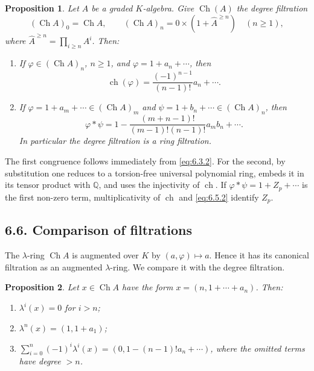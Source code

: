 \documentclass[13pt]{extarticle}
\newcommand{\QQ}{\mathbb Q}
\newcommand{\Ch}{\operatorname{Ch}}
\newcommand{\ch}{\operatorname{ch}}
\newtheorem*{proposition}{Proposition}
\begin{document}
\begin{proposition}\label{prop:6.5}
Let $A$ be a graded $K$-algebra. Give $\Ch(A)$ the degree filtration
\begin{equation}\label{eq:6.5.1}
(\Ch A)_0=\Ch A,
\qquad
(\Ch A)_n=0\times(1+\widehat A^{\geq n})\quad(n\geq 1),
\end{equation}
where $\widehat A^{\geq n}=\prod_{i\geq n}A^i$. Then:
\begin{enumerate}[label=(\roman*)]
\item If $\varphi\in(\Ch A)_n$, $n\geq 1$, and $\varphi=1+a_n+\cdots$, then
\begin{equation}\label{eq:6.5.2}
\ch(\varphi)=\frac{(-1)^{n-1}}{(n-1)!}a_n+\cdots.
\end{equation}
\item If $\varphi=1+a_m+\cdots\in(\Ch A)_m$ and $\psi=1+b_n+\cdots\in(\Ch A)_n$, then
\begin{equation}\label{eq:6.5.3}
\varphi*\psi=1-\frac{(m+n-1)!}{(m-1)!(n-1)!}a_mb_n+\cdots.
\end{equation}
In particular the degree filtration is a ring filtration.
\end{enumerate}
\end{proposition}

The first congruence follows immediately from \eqref{eq:6.3.2}. For the second, by substitution one reduces to a torsion-free universal polynomial ring, embeds it in its tensor product with $\QQ$, and uses the injectivity of $\ch$. If $\varphi*\psi=1+Z_p+\cdots$ is the first non-zero term, multiplicativity of $\ch$ and \eqref{eq:6.5.2} identify $Z_p$.

\subsection*{6.6. Comparison of filtrations}
The $\lambda$-ring $\Ch A$ is augmented over $K$ by $(a,\varphi)\mapsto a$. Hence it has its canonical filtration as an augmented $\lambda$-ring. We compare it with the degree filtration.

\begin{proposition}\label{prop:6.6.1}
Let $x\in\Ch A$ have the form $x=(n,1+\cdots+a_n)$. Then:
\begin{enumerate}[label=(\roman*)]
\item $\lambda^i(x)=0$ for $i>n$;
\item $\lambda^n(x)=(1,1+a_1)$;
\item $\sum_{i=0}^{n}(-1)^i\lambda^i(x)=(0,1-(n-1)!a_n+\cdots)$, where the omitted terms have degree $>n$.
\end{enumerate}
\end{proposition}
\end{document}
